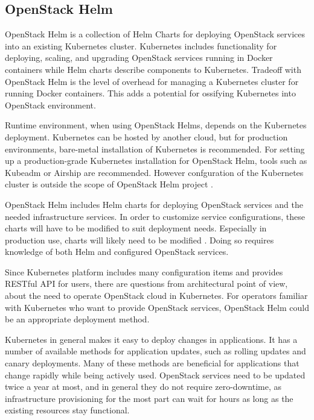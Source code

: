 \subsection{OpenStack Helm}

OpenStack Helm \cite{openstack-helm} is a collection of Helm Charts for
deploying OpenStack services into an existing Kubernetes cluster. Kubernetes
includes functionality for deploying, scaling, and upgrading OpenStack services
running in Docker containers while Helm charts describe components to
Kubernetes. Tradeoff with OpenStack Helm is the level of overhead for managing
a Kubernetes cluster for running Docker containers. This adds a potential for
ossifying Kubernetes into OpenStack environment.

Runtime environment, when using OpenStack Helms, depends on the Kubernetes
deployment. Kubernetes can be hosted by another cloud, but for production
environments, bare-metal installation of Kubernetes is recommended. For setting
up a production-grade Kubernetes installation for OpenStack Helm, tools such as
Kubeadm or Airship \cite{airship} are recommended. However confguration of the
Kubernetes cluster is outside the scope of OpenStack Helm project
\cite{openstack-helm}.

OpenStack Helm includes Helm charts for deploying OpenStack services and the
needed infrastructure services. In order to customize service configurations,
these charts will have to be modified to suit deployment needs. Especially in
production use, charts will likely need to be modified \cite{openstack-helm}.
Doing so requires knowledge of both Helm and configured OpenStack services.

Since Kubernetes platform includes many configuration items and provides
RESTful API for users, there are questions from architectural point of view,
about the need to operate OpenStack cloud in Kubernetes. For operators familiar
with Kubernetes who want to provide OpenStack services, OpenStack Helm could be
an appropriate deployment method.

Kubernetes in general makes it easy to deploy changes in applications. It has a
number of available methods for application updates, such as rolling updates
and canary deployments. Many of these methods are beneficial for applications
that change rapidly while being actively used. OpenStack services need to be
updated twice a year at most, and in general they do not require zero-downtime,
as infrastructure provisioning for the most part can wait for hours as long as
the existing resources stay functional.

